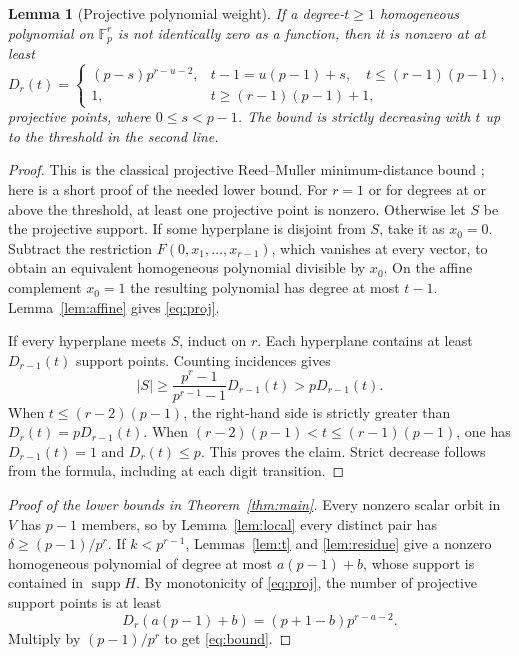 \documentclass[11pt]{article}
\newtheorem{lemma}[theorem]{Lemma}
\theoremstyle{remark}\newtheorem{remark}[theorem]{Remark}
\newcommand{\F}{\mathbb F}
\newcommand{\supp}{\operatorname{supp}}
\begin{document}
\begin{lemma}[Projective polynomial weight]\label{lem:proj}
If a degree-$t\ge1$ homogeneous polynomial on $\F_p^r$ is not identically zero as a function, then it is nonzero at at least
\begin{equation}\label{eq:proj}
 D_r(t)=\begin{cases}
 (p-s)p^{r-u-2},&t-1=u(p-1)+s,\quad t\le(r-1)(p-1),\\
 1,& t\ge(r-1)(p-1)+1,
 \end{cases}
\end{equation}
projective points, where $0\le s<p-1$. The bound is strictly decreasing with $t$ up to the threshold in the second line.
\end{lemma}
\begin{proof}
This is the classical projective Reed--Muller minimum-distance bound \cite{Sorensen,GL}; here is a short proof of the needed lower bound. For $r=1$ or for degrees at or above the threshold, at least one projective point is nonzero. Otherwise let $S$ be the projective support. If some hyperplane is disjoint from $S$, take it as $x_0=0$. Subtract the restriction $F(0,x_1,\ldots,x_{r-1})$, which vanishes at every vector, to obtain an equivalent homogeneous polynomial divisible by $x_0$. On the affine complement $x_0=1$ the resulting polynomial has degree at most $t-1$. Lemma~\ref{lem:affine} gives \eqref{eq:proj}.

If every hyperplane meets $S$, induct on $r$. Each hyperplane contains at least $D_{r-1}(t)$ support points. Counting incidences gives
\[
 |S|\ge \frac{p^r-1}{p^{r-1}-1}D_{r-1}(t)>p D_{r-1}(t).
\]
When $t\le(r-2)(p-1)$, the right-hand side is strictly greater than $D_r(t)=pD_{r-1}(t)$. When $(r-2)(p-1)<t\le(r-1)(p-1)$, one has $D_{r-1}(t)=1$ and $D_r(t)\le p$. This proves the claim. Strict decrease follows from the formula, including at each digit transition.
\end{proof}

\begin{proof}[Proof of the lower bounds in Theorem~\ref{thm:main}]
Every nonzero scalar orbit in $V$ has $p-1$ members, so by Lemma~\ref{lem:local} every distinct pair has $\delta\ge(p-1)/p^r$. If $k<p^{r-1}$, Lemmas~\ref{lem:t} and \ref{lem:residue} give a nonzero homogeneous polynomial of degree at most $a(p-1)+b$, whose support is contained in $\supp H$. By monotonicity of \eqref{eq:proj}, the number of projective support points is at least
\[
 D_r(a(p-1)+b)=(p+1-b)p^{r-a-2}.
\]
Multiply by $(p-1)/p^r$ to get \eqref{eq:bound}.
\end{proof}
\end{document}
